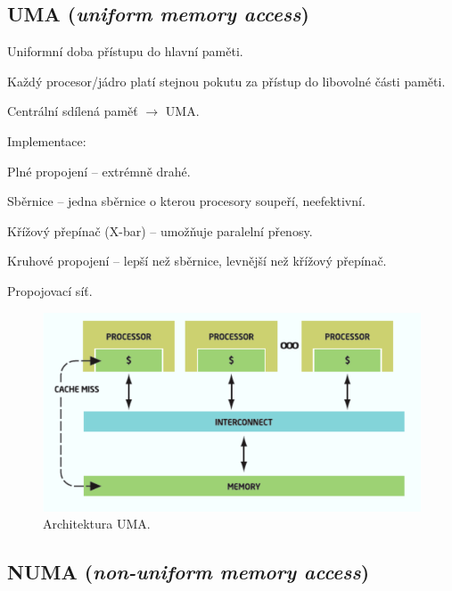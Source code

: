 \subsection{UMA (\textit{uniform memory access})}

\begin{compactitem}
    \item Uniformní doba přístupu do hlavní paměti. \begin{compactitem}
        \item Každý procesor/jádro platí stejnou pokutu za přístup do libovolné části paměti.
    \end{compactitem}

    \item Centrální sdílená paměť $\rightarrow$ UMA.

    \item Implementace: \begin{compactitem}
        \item Plné propojení -- extrémně drahé.
        \item Sběrnice -- jedna sběrnice o kterou procesory soupeří, neefektivní.
        \item Křížový přepínač (X-bar) -- umožňuje paralelní přenosy.
        \item Kruhové propojení -- lepší než sběrnice, levnější než křížový přepínač.
        \item Propojovací síť.
    \end{compactitem}

    \begin{figure}[H]
        \centering
        \includegraphics[width=0.9\linewidth]{uma.png}
        \caption{Architektura UMA.}
    \end{figure}
\end{compactitem}

\subsection{NUMA (\textit{non-uniform memory access})}

